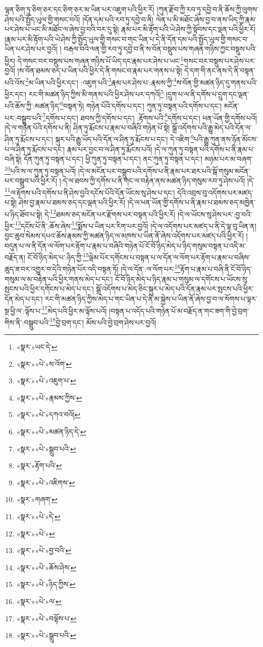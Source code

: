 ལྷན་ཅིག་ཏུ་ཅིག་ཅར་དང་ཅིག་ཅར་མ་ཡིན་པར་འཇུག་པའི་ཕྱིར་རོ། །ཀུན་རྫོབ་ཀྱི་རབ་ཏུ་དབྱེ་བ་ནི་ཆོས་ཀྱི་ལུགས་ཤེས་པའི་སྤྱོད་ཡུལ་གྱི་གསང་བའོ། །དོན་དམ་པའི་རབ་ཏུ་དབྱེ་བ་ནི། ལེན་པ་མི་མཐོང་ཞེས་བྱ་བ་ནས་ཡིད་ཀྱི་རྣམ་པར་ཤེས་པ་ཡང་མི་མཐོང་ལ་ཞེས་བྱ་བའི་བར་དུ་སྟེ། རྣམ་པར་མི་རྟོག་པའི་ཡེ་ཤེས་ཀྱི་སྟོབས་དང་ལྡན་པའི་ཕྱིར་རོ། །རྣམ་པར་མི་རྟོག་པའི་ཡེ་ཤེས་ཀྱི་སྤྱོད་ཡུལ་གྱི་གསང་བ་གང་ཡིན་པ་དེ་ནི་དོན་དམ་པའི་སྤྱོད་ཡུལ་གྱི་གསང་བ་ཡིན་པར་ཤེས་པར་བྱའོ། །
བརྒལ་བའི་ལན་གྱི་རབ་ཏུ་དབྱེ་བ་ནི་ས་བོན་བསྡུས་པས་གཞན་གཉིས་ཀྱང་བསྡུས་པའི་ཕྱིར། དེ་གསང་བར་བསྡུས་པས་གཞན་གཉིས་པོ་ཡིད་དང་རྣམ་པར་ཤེས་པ་ཡང་\footnote{«སྣར་»ཡང་དེ་}གསང་བར་བསྡུས་པར་ཤེས་པར་བྱའོ། །ས་བོན་ཐམས་ཅད་པ་ཡིན་པའི་ཕྱིར་དེ་ནི་གསང་བ་རྣམ་པར་གནས་པ་སྟེ། དེ་དག་གི་ནང་ནས་དེ་ནི་བསྟན་པའི་འོས་\footnote{«སྣར་»«པེ་»ས་འོག་}མ་ཡིན་པའི་ཕྱིར་དང་། :འཇུག་པའི་\footnote{«སྣར་»«པེ་»འཇུག་པ་}རྣམ་པར་ཤེས་པ་:རྣམས་ཀྱི་\footnote{«སྣར་»«པེ་»རྣམས་ཀྱིས་}ས་བོན་གྱི་མཚན་ཉིད་དུ་གནས་པའི་ཕྱིར་དང་། རང་གི་མཚན་ཉིད་ཀྱིས་མི་གནས་པའི་ཕྱིར་ཤེས་པར་དཀའོ།\footnote{«སྣར་»«པེ་»དཀའ་བའོ།} །དྲུག་པ་ལ་ནི་དགོས་པ་དྲུག་དང་ལྡན་པའི་ཆོས་ཀྱི་:མཚན་ཉིད་\footnote{«སྣར་»«པེ་»མཚན་ཉིད་དེ་}བསྟན་ཏེ། གཉེན་པོའི་དགོས་པ་དང་། ཀུན་ཏུ་བསྟན་པའི་དགོས་པ་དང་། མངོན་པར་:བསྒྲུབ་པའི་\footnote{«སྣར་»«པེ་»སྒྲུབ་པའི་}དགོས་པ་དང་། ཐབས་ཀྱི་དགོས་པ་དང་། :རྟོགས་པའི་\footnote{«སྣར་»རྟོག་པའི་}དགོས་པ་དང་། ཕན་ཡོན་གྱི་དགོས་པའོ། །དེ་ལ་གཉེན་པོའི་དགོས་པ་ནི། ཤིན་ཏུ་རྨོངས་པ་རྣམ་པ་བཞིའི་གཉེན་པོ་སྟེ། སྒྲོ་འདོགས་པའི་རྒྱུ་མེད་པའི་དོན་ལ་ཤིན་ཏུ་རྨོངས་པ་དང་། སྐུར་པའི་རྒྱུ་ཡོད་པའི་དོན་ལ་ཤིན་ཏུ་རྨོངས་པ་དང་། དེ་འཇིག་\footnote{«སྣར་»«པེ་»འཇིགས་}པའི་རྒྱུ་ཀུན་ནས་ཉོན་མོངས་པ་ལ་ཤིན་ཏུ་རྨོངས་པ་དང་། རྣམ་པར་བྱང་བ་ལ་ཤིན་ཏུ་རྨོངས་པའོ། །དེ་ལ་ཀུན་ཏུ་བསྟན་པའི་དགོས་པ་ནི་རྣམ་པ་བཞི་སྟེ། དོན་ཀུན་ཏུ་བསྟན་པ་དང་། ཕྱི་ཀུན་ཏུ་བསྟན་པ་དང་། ནང་ཀུན་ཏུ་བསྟན་པ་དང་། མཉམ་པར་མ་བཞག་\footnote{«སྣར་»གཞག་}པའི་ས་ལ་ཀུན་ཏུ་བསྟན་པའོ། །དེ་ལ་མངོན་པར་བསྒྲུབ་པའི་དགོས་པ་ནི་རྣམ་པར་ཐར་པའི་སྒོ་གསུམ་མངོན་པར་བསྒྲུབ་པའི་ཕྱིར་རོ། །:དེ་ལ་ཐབས་ཀྱི་དགོས་པ་ནི་གང་ལ་བརྟེན་ནས་མཚན་ཉིད་གསུམ་རབ་ཏུ་ཤེས་པའོ། །དེ་\footnote{«སྣར་»«པེ་»དེ་}ལ་རྟོགས་པའི་དགོས་པ་ནི་ཤེས་བྱའི་དངོས་པོའི་དོན་ཡོངས་སུ་ཤེས་པ་དང་། དེའི་འབྲས་བུ་འདོགས་པར་མཛད་པ་སྟེ། ཤེས་བྱ་རྣམ་པ་ཐམས་ཅད་དང་ལྡན་པའི་ཕྱིར་རོ། །དེ་ལ་ཕན་ཡོན་གྱི་དགོས་པ་ནི་རྣམ་པ་ཐམས་ཅད་མཁྱེན་པ་ཉིད་ཐོབ་པ་སྟེ། དེ་\footnote{«སྣར་»«པེ་»}ཐམས་ཅད་མངོན་པར་རྫོགས་པར་བསྟན་པའི་ཕྱིར་རོ། །དེ་ལ་ཡོངས་སུ་ཤེས་པར་:བྱ་བའི་ཕྱིར་\footnote{«སྣར་»«པེ་»བྱ་བའི་}དངོས་པོ་ནི་:ཆོས་ཞེས་\footnote{«སྣར་»«པེ་»ཆོས་ཤེས་}སྨོས་པ་ཡིན་པར་རིག་པར་བྱའོ། །དེ་ལ་འདོགས་པར་མཛད་པ་ནི་དེ་ལྟ་བུ་ཡིན་ན། བྱང་ཆུབ་སེམས་དཔའ་ཆོས་རྣམས་ཀྱི་མཚན་ཉིད་ལ་མཁས་པ་ཡིན་ནོ་ཞེས་འདོགས་པར་མཛད་པའི་ཕྱིར་རོ། །བདུན་པ་ལ་ནི་དོན་ལ་ལོག་པར་རྟོག་པ་རྣམ་པ་བཞིའི་གཉེན་པོ་ངོ་བོ་ཉིད་མེད་པ་ཉིད་གསུམ་བསྟན་པ་འདི་མ་བརྗོད་ན། ངོ་བོ་ཉིད་མེད་པ་:ཉིད་ཀྱི་\footnote{«སྣར་»«པེ་»ཉིད་ཀྱིས་}ལྡེམ་པོར་དགོངས་པ་བསྟན་པ་ལ་དོན་ལ་ལོག་པར་རྟོག་པ་རྣམ་པ་བཞིས་ཆུད་ཟ་བར་འགྱུར་བ་དེའི་གཉེན་པོར་འདི་བསྟན་ཏོ། །དེ་ལ་དོན་:ལ་ལོག་པར་\footnote{«སྣར་»«པེ་»ལ་}རྟོག་པ་རྣམ་པ་བཞི་ནི་ངོ་བོ་ཉིད་གསུམ་ལ་མ་བརྟེན་པའི་ཕྱིར་གནས་མེད་པ་དང་། ངོ་བོ་ཉིད་མེད་པ་ཉིད་རྣམ་པ་གསུམ་ལ་དགོངས་པ་ཡོངས་སུ་སྤངས་པའི་ཕྱིར་དགོངས་པ་མེད་པ་དང་། སྒྲོ་འདོགས་པ་མེད་ཅིང་སྐུར་པ་མེད་པའི་དོན་རྣམ་པར་སྤངས་པའི་ཕྱིར་དོན་མེད་པ་དང་། རང་གི་མཚན་ཉིད་ཀྱིས་མེད་པ་གང་ཡིན་པ་དེ་ནི་མ་སྐྱེས་པ་ཡིན་ནོ་ཞེས་བྱ་བ་ལ་སོགས་པ་ལྟར་སྔ་ཕྱི་ལ་:ལྟོས་པ་\footnote{«སྣར་»«པེ་»བལྟོས་པ་}མེད་པའི་ཕྱིར་མ་ལྟོས་པའོ། །བསྟན་པ་འདོད་པའི་གཉེན་པོ་མ་བརྗོད་ན་གང་ཟག་གི་བྱེ་བྲག་གིས་ནི་:བསྒྲུབ་པའི་\footnote{«སྣར་»«པེ་»སྒྲུབ་པའི་}བྱེ་བྲག་དང་། མོས་པའི་བྱེ་བྲག་ཤེས་པར་བྱའོ། 